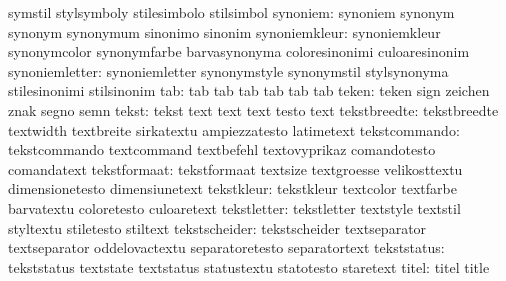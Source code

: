                            symstil                   stylsymboly
                           stilesimbolo              stilsimbol
                 synoniem: synoniem                  synonym
                           synonym                   synonymum
                           sinonimo                  sinonim
            synoniemkleur: synoniemkleur             synonymcolor
                           synonymfarbe              barvasynonyma
                           coloresinonimi            culoaresinonim
           synoniemletter: synoniemletter            synonymstyle
                           synonymstil               stylsynonyma
                           stilesinonimi             stilsinonim
                      tab: tab                       tab
                           tab                       tab
                           tab                       tab
                    teken: teken                     sign
                           zeichen                   znak
                           segno                     semn
                    tekst: tekst                     text
                           text                      text
                           testo                     text
             tekstbreedte: tekstbreedte              textwidth
                           textbreite                sirkatextu
                           ampiezzatesto             latimetext
            tekstcommando: tekstcommando             textcommand
                           textbefehl                textovyprikaz
                           comandotesto              comandatext
             tekstformaat: tekstformaat              textsize
                           textgroesse               velikosttextu
                           dimensionetesto           dimensiunetext
               tekstkleur: tekstkleur                textcolor
                           textfarbe                 barvatextu
                           coloretesto               culoaretext
              tekstletter: tekstletter               textstyle
                           textstil                  styltextu
                           stiletesto                stiltext
            tekstscheider: tekstscheider             textseparator
                           textseparator             oddelovactextu
                           separatoretesto           separatortext
              tekststatus: tekststatus               textstate
                           textstatus                statustextu
                           statotesto                staretext
                    titel: titel                     title
